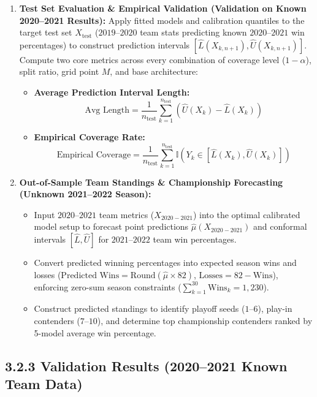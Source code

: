 \documentclass[11pt,a4paper]{article}
\begin{document}
\begin{enumerate}
    \item \textbf{Test Set Evaluation \& Empirical Validation (Validation on Known 2020--2021 Results):}
    Apply fitted models and calibration quantiles to the target test set $X_{\text{test}}$ ($2019$--$2020$ team stats predicting known $2020$--$2021$ win percentages) to construct prediction intervals $[\hat{L}(X_{k, n+1}), \hat{U}(X_{k, n+1})]$. Compute two core metrics across every combination of coverage level ($1-\alpha$), split ratio, grid point $M$, and base architecture:
    \begin{itemize}
        \item \textbf{Average Prediction Interval Length:}
        \[ \text{Avg Length} = \frac{1}{n_{\text{test}}} \sum_{k=1}^{n_{\text{test}}} \left( \hat{U}(X_k) - \hat{L}(X_k) \right) \]
        \item \textbf{Empirical Coverage Rate:}
        \[ \text{Empirical Coverage} = \frac{1}{n_{\text{test}}} \sum_{k=1}^{n_{\text{test}}} \mathbb{I}\left( Y_k \in [\hat{L}(X_k), \hat{U}(X_k)] \right) \]
    \end{itemize}

    \item \textbf{Out-of-Sample Team Standings \& Championship Forecasting (Unknown 2021--2022 Season):}
    \begin{itemize}
        \item Input $2020$--$2021$ team metrics ($X_{2020-2021}$) into the optimal calibrated model setup to forecast point predictions $\hat{\mu}(X_{2020-2021})$ and conformal intervals $[\hat{L}, \hat{U}]$ for $2021$--$2022$ team win percentages.
        \item Convert predicted winning percentages into expected season wins and losses ($\text{Predicted Wins} = \text{Round}(\hat{\mu} \times 82)$, $\text{Losses} = 82 - \text{Wins}$), enforcing zero-sum season constraints ($\sum_{k=1}^{30} \text{Wins}_k = 1,230$).
        \item Construct predicted standings to identify playoff seeds ($1$--$6$), play-in contenders ($7$--$10$), and determine top championship contenders ranked by 5-model average win percentage.
    \end{itemize}
\end{enumerate}

\subsection{3.2.3 Validation Results (2020--2021 Known Team Data)}
\end{document}
